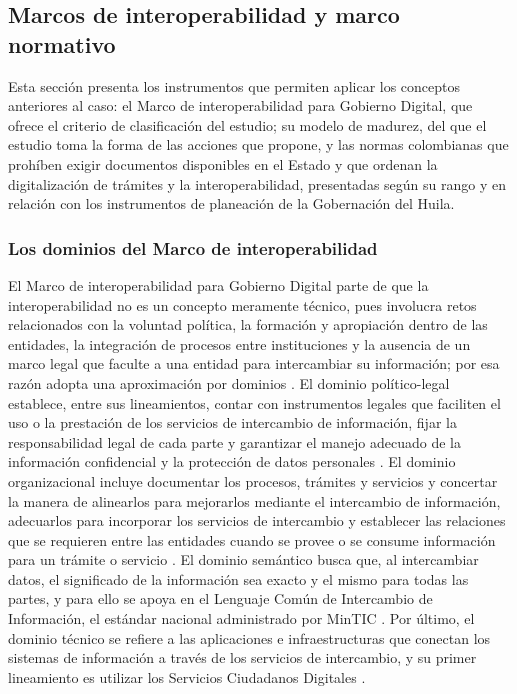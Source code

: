\subsection{Marcos de interoperabilidad y marco normativo}

Esta sección presenta los instrumentos que permiten aplicar los conceptos anteriores al caso: el Marco de interoperabilidad para Gobierno Digital, que ofrece el criterio de clasificación del estudio; su modelo de madurez, del que el estudio toma la forma de las acciones que propone, y las normas colombianas que prohíben exigir documentos disponibles en el Estado y que ordenan la digitalización de trámites y la interoperabilidad, presentadas según su rango y en relación con los instrumentos de planeación de la Gobernación del Huila.

\subsubsection{Los dominios del Marco de interoperabilidad}

El Marco de interoperabilidad para Gobierno Digital parte de que la interoperabilidad no es un concepto meramente técnico, pues involucra retos relacionados con la voluntad política, la formación y apropiación dentro de las entidades, la integración de procesos entre instituciones y la ausencia de un marco legal que faculte a una entidad para intercambiar su información; por esa razón adopta una aproximación por dominios \parencite[p.~33]{mintic2019marco}. El dominio político-legal establece, entre sus lineamientos, contar con instrumentos legales que faciliten el uso o la prestación de los servicios de intercambio de información, fijar la responsabilidad legal de cada parte y garantizar el manejo adecuado de la información confidencial y la protección de datos personales \parencite[p.~34]{mintic2019marco}. El dominio organizacional incluye documentar los procesos, trámites y servicios y concertar la manera de alinearlos para mejorarlos mediante el intercambio de información, adecuarlos para incorporar los servicios de intercambio y establecer las relaciones que se requieren entre las entidades cuando se provee o se consume información para un trámite o servicio \parencite[p.~38]{mintic2019marco}. El dominio semántico busca que, al intercambiar datos, el significado de la información sea exacto y el mismo para todas las partes, y para ello se apoya en el Lenguaje Común de Intercambio de Información, el estándar nacional administrado por MinTIC \parencite[p.~43]{mintic2019marco}. Por último, el dominio técnico se refiere a las aplicaciones e infraestructuras que conectan los sistemas de información a través de los servicios de intercambio, y su primer lineamiento es utilizar los Servicios Ciudadanos Digitales \parencite[p.~47]{mintic2019marco}.

